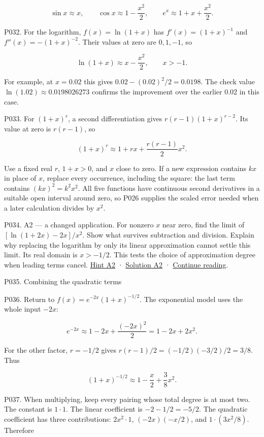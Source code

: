 \documentclass[
  11pt,
]{article}
\providecommand{\gt}{>}
\begin{document}
\[
\sin x\approx x,\qquad \cos x\approx1-\frac{x^2}{2},\qquad e^x\approx1+x+\frac{x^2}{2}.
\]

P032. For the logarithm, \(f(x)=\ln(1+x)\) has \(f'(x)=(1+x)^{-1}\) and
\(f''(x)=-(1+x)^{-2}\). Their values at zero are \(0,1,-1\), so

\[
\ln(1+x)\approx x-\frac{x^2}{2},\qquad x>-1.
\]

For example, at \(x=0.02\) this gives \(0.02-(0.02)^2/2=0.0198\). The
check value \(\ln(1.02)\approx0.0198026273\) confirms the improvement
over the earlier 0.02 in this case.

P033. For \((1+x)^r\), a second differentiation gives
\(r(r-1)(1+x)^{r-2}\). Its value at zero is \(r(r-1)\), so

\[
(1+x)^r\approx1+rx+\frac{r(r-1)}2x^2.
\]

Use a fixed real \(r\), \(1+x\gt 0\), and \(x\) close to zero. If a new
expression contains \(kx\) in place of \(x\), replace every occurrence,
including the square: the last term contains \((kx)^2=k^2x^2\). All five
functions have continuous second derivatives in a suitable open interval
around zero, so P026 supplies the scaled error needed when a later
calculation divides by \(x^2\).

P034. A2 --- a changed application. For nonzero \(x\) near zero, find
the limit of \([\ln(1+2x)-2x]/x^2\). Show what survives subtraction and
division. Explain why replacing the logarithm by only its linear
approximation cannot settle this limit. Its real domain is
\(x\gt -1/2\). This tests the choice of approximation degree when
leading terms cancel. \protect\hyperlink{h2}{Hint A2} ·
\protect\hyperlink{s2}{Solution A2} ·
\protect\hyperlink{after-a2}{Continue reading}.

P035. Combining the quadratic terms

P036. Return to \(f(x)=e^{-2x}(1+x)^{-1/2}\). The exponential model uses
the whole input \(-2x\):

\[
e^{-2x}\approx1-2x+\frac{(-2x)^2}{2}=1-2x+2x^2.
\]

For the other factor, \(r=-1/2\) gives \(r(r-1)/2=(-1/2)(-3/2)/2=3/8\).
Thus

\[
(1+x)^{-1/2}\approx1-\frac{x}{2}+\frac38x^2.
\]

P037. When multiplying, keep every pairing whose total degree is at most
two. The constant is \(1\cdot1\). The linear coefficient is
\(-2-1/2=-5/2\). The quadratic coefficient has three contributions:
\(2x^2\cdot1\), \((-2x)(-x/2)\), and \(1\cdot(3x^2/8)\). Therefore
\end{document}
